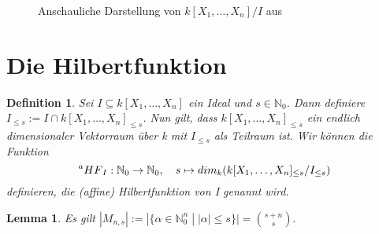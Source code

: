 \documentclass{article}
\newtheorem{definition}[satz]{Definition}
\newtheorem{lemma}[satz]{Lemma}
\newcommand*{\R}{k[X_{1},\ldots,X_{n}]}
\begin{document}
	\begin{figure}[ht]
		\centering
		\caption{Anschauliche Darstellung von \(\R/I\) aus \cite{CLOS}}
		\label{dots}
	\end{figure}


\section{Die Hilbertfunktion}

	\begin{definition} \label{1.2.11}
	Sei \(I \subseteq \R\) ein Ideal und \(s \in \mathbb{N}_{0}\). Dann definiere \(I_{\leq s} :=
	I \cap \R_{\leq s}\). Nun gilt, dass \(\R_{\leq s}\) ein endlich dimensionaler Vektorraum über
	k  mit \(I_{\leq s}\) als Teilraum ist. Wir können die Funktion \begin{displaymath}
	\prescript{a}{}{HF}_{I} : \mathbb{N}_{0} \rightarrow \mathbb{N}_{0}, \quad s \mapsto
	dim_{k}(\R_{\leq s}/I_{\leq s})	\end{displaymath} definieren, die (affine) Hilbertfunktion
	von I genannt wird.
	\end{definition}

	
	\begin{lemma}\label{kombinatorik}
	Es gilt \(|M_{n,s}| := |\{\alpha \in \mathbb{N}^{n}_{0}\; |\; |\alpha| \leq s \}| = \binom{s + n}{s}. \)
	\end{lemma}
\end{document}
